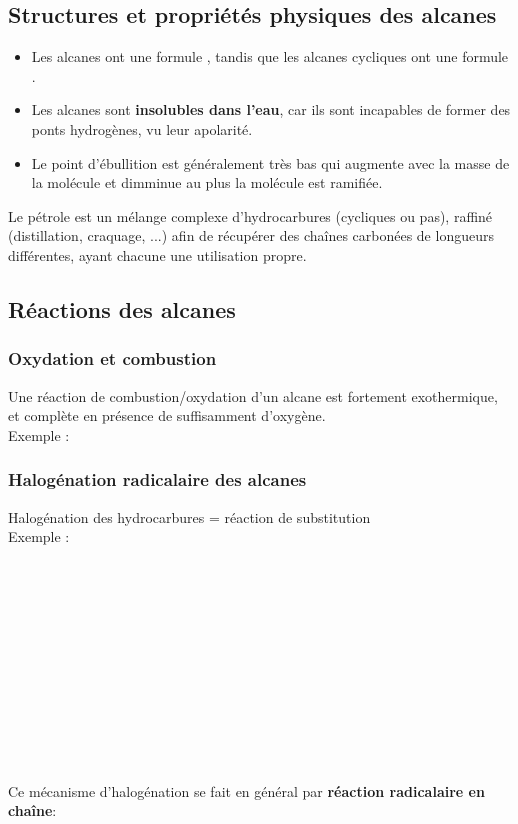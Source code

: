 \documentclass{article}
\newcommand{\insertslide}[2]{
\begin{center}
    \fbox{\texttt{[image: \#1]}}
\end{center}
}
\begin{document}
    \subsection{Structures et propriétés physiques des alcanes}
        \begin{itemize}
            \item Les alcanes ont une formule , tandis que les alcanes cycliques ont une formule .
            \item Les alcanes sont \textbf{insolubles dans l'eau}, car ils sont incapables de former des ponts hydrogènes, vu leur apolarité.
            \item Le point d'ébullition est généralement très bas qui augmente avec la masse de la molécule et dimminue au plus la molécule est ramifiée.
        \end{itemize}
        Le pétrole est un mélange complexe d'hydrocarbures (cycliques ou pas), raffiné (distillation, craquage, ...) afin de récupérer des chaînes carbonées de longueurs différentes, ayant chacune une utilisation propre.
    
    \subsection{Réactions des alcanes}
        \subsubsection{Oxydation et combustion}
            Une réaction de combustion/oxydation d'un alcane est fortement exothermique, et complète en présence de suffisamment d'oxygène.\\
            Exemple : 

        \subsubsection{Halogénation radicalaire des alcanes}
            Halogénation des hydrocarbures = réaction de substitution \\
            Exemple : \\
            \\\\\\\\\\\\\\\\\\\\\\\\
            Ce mécanisme d'halogénation se fait en général par \textbf{réaction radicalaire en chaîne}:
            \insertslide{Slides/CM4}{16}
            \insertslide{Slides/CM4}{17}
        
\end{document}
